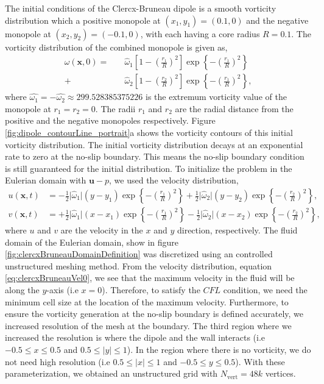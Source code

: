 The initial conditions of the Clercx-Bruneau dipole is a smooth vorticity distribution which a positive monopole at $(x_1,y_1)=(0.1,0)$ and the negative monopole at $(x_2,y_2)=(-0.1,0)$, with each having a core radius $R = 0.1$. The vorticity distribution of the combined monopole is given as,
	\begin{equation}
	\begin{split}
	\omega(\mathbf{x},0) = \quad &\hat{\omega}_1\left[1-\left(\frac{r_1}{R}\right)^2\right]\exp\left\{-\left(\frac{r_1}{R}\right)^2\right\} \\
	+\ &\hat{\omega}_2\left[1-\left(\frac{r_2}{R}\right)^2\right]\exp\left\{-\left(\frac{r_1}{R}\right)^2\right\} ,
	\end{split}
	\label{eq:clercxBruneauOmega0}
	\end{equation}
where $\hat{\omega_1} = - \hat{\omega_2} \approx 299.528385375226$ is the extremum vorticity value of the monopole at $r_1=r_2=0$. The radii $r_1$ and $r_2$ are the radial distance from the positive and the negative monopoles respectively. Figure \ref{fig:dipole_contourLine_portrait}a shows the vorticity contours of this initial vorticity distribution. The initial vorticity distribution decays at an exponential rate to zero at the no-slip boundary. This means the no-slip boundary condition is still guaranteed for the initial distribution. To initialize the problem in the Eulerian domain with $\mathbf{u}-p$, we used the velocity distribution, 
	\begin{subequations}
	\begin{align}
	u(\mathbf{x},t) & = -\frac{1}{2}\lvert\hat{\omega}_1\rvert(y-y_1)\exp\left\{-\left(\frac{r_1}{R}\right)^2\right\} + \frac{1}{2}\lvert\hat{\omega}_2\rvert(y-y_2)\exp\left\{-\left(\frac{r_2}{R}\right)^2\right\}, \\
	v(\mathbf{x},t) & = +\frac{1}{2}\lvert\hat{\omega}_1\rvert(x-x_1)\exp\left\{-\left(\frac{r_1}{R}\right)^2\right\} - \frac{1}{2}\lvert\hat{\omega}_2\rvert(x-x_2)\exp\left\{-\left(\frac{r_2}{R}\right)^2\right\},
	\end{align}
	\label{eq:clercxBruneauVel0}
	\end{subequations}
where $u$ and $v$ are the velocity in the $x$ and $y$ direction, respectively. The fluid domain of the Eulerian domain, show in figure \ref{fig:clercxBruneauDomainDefinition} was discretized using an controlled unstructured meshing method. From the velocity distribution, equation \ref{eq:clercxBruneauVel0}, we see that the maximum velocity in the fluid will be along the $y$-axis (i.e $x=0$). Therefore, to satisfy the $CFL$ condition, we need the minimum cell size at the location of the maximum velocity. Furthermore, to ensure the vorticity generation at the no-slip boundary is defined accurately, we increased resolution of the mesh at the boundary. The third region where we increased the resolution is where the dipole and the wall interacts (i.e $-0.5\le{x}\le0.5$ and $0.5\le{\left|y\right|}\le1$). In the region where there is no vorticity, we do not need high resolution (i.e $0.5\le{\left|x\right|}\le1$ and $-0.5\le{y}\le0.5$). With these parameterization, we obtained an unstructured grid with $N_{\mathrm{vert}}=48k$ vertices.


